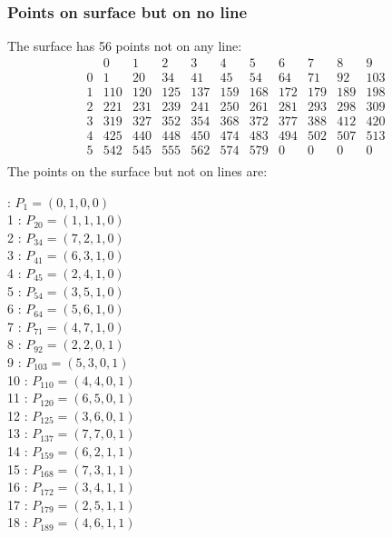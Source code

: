 \documentclass{article}
\begin{document}
{\subsubsection*{Points on surface but on no line}
The surface has 56 points not on any line:\\
$$
\begin{array}{r|*{10}{r}}
 & 0 & 1 & 2 & 3 & 4 & 5 & 6 & 7 & 8 & 9\\
\hline
0 & 1 & 20 & 34 & 41 & 45 & 54 & 64 & 71 & 92 & 103\\
1 & 110 & 120 & 125 & 137 & 159 & 168 & 172 & 179 & 189 & 198\\
2 & 221 & 231 & 239 & 241 & 250 & 261 & 281 & 293 & 298 & 309\\
3 & 319 & 327 & 352 & 354 & 368 & 372 & 377 & 388 & 412 & 420\\
4 & 425 & 440 & 448 & 450 & 474 & 483 & 494 & 502 & 507 & 513\\
5 & 542 & 545 & 555 & 562 & 574 & 579 & 0 & 0 & 0 & 0\\
\end{array}
$$
The points on the surface but not on lines are:\\
\begin{multicols}{2}
 : $P_{1}=( 0, 1, 0, 0 )$\\
1 : $P_{20}=( 1, 1, 1, 0 )$\\
2 : $P_{34}=( 7, 2, 1, 0 )$\\
3 : $P_{41}=( 6, 3, 1, 0 )$\\
4 : $P_{45}=( 2, 4, 1, 0 )$\\
5 : $P_{54}=( 3, 5, 1, 0 )$\\
6 : $P_{64}=( 5, 6, 1, 0 )$\\
7 : $P_{71}=( 4, 7, 1, 0 )$\\
8 : $P_{92}=( 2, 2, 0, 1 )$\\
9 : $P_{103}=( 5, 3, 0, 1 )$\\
10 : $P_{110}=( 4, 4, 0, 1 )$\\
11 : $P_{120}=( 6, 5, 0, 1 )$\\
12 : $P_{125}=( 3, 6, 0, 1 )$\\
13 : $P_{137}=( 7, 7, 0, 1 )$\\
14 : $P_{159}=( 6, 2, 1, 1 )$\\
15 : $P_{168}=( 7, 3, 1, 1 )$\\
16 : $P_{172}=( 3, 4, 1, 1 )$\\
17 : $P_{179}=( 2, 5, 1, 1 )$\\
18 : $P_{189}=( 4, 6, 1, 1 )$\\

\end{multicols}}
\end{document}

